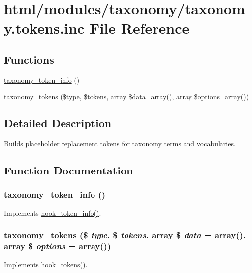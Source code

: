\hypertarget{taxonomy_8tokens_8inc}{
\section{html/modules/taxonomy/taxonomy.tokens.inc File Reference}
\label{taxonomy_8tokens_8inc}
}
\subsection*{Functions}
\begin{DoxyCompactItemize}
\item 
\hyperlink{taxonomy_8tokens_8inc_ad5e9671b12bbb1663aaf884486e4e63a}{taxonomy\_\-token\_\-info} ()
\item 
\hyperlink{taxonomy_8tokens_8inc_adcc9a4b5359d355e80f56436164af8ef}{taxonomy\_\-tokens} (\$type, \$tokens, array \$data=array(), array \$options=array())
\end{DoxyCompactItemize}


\subsection{Detailed Description}
Builds placeholder replacement tokens for taxonomy terms and vocabularies. 

\subsection{Function Documentation}
\hypertarget{taxonomy_8tokens_8inc_ad5e9671b12bbb1663aaf884486e4e63a}{
\subsubsection[{taxonomy\_\-token\_\-info}]{\setlength{\rightskip}{0pt plus 5cm}taxonomy\_\-token\_\-info ()}}
\label{taxonomy_8tokens_8inc_ad5e9671b12bbb1663aaf884486e4e63a}
Implements \hyperlink{group__hooks_gab868597197cf36911f95dcd29ae0b954}{hook\_\-token\_\-info()}. \hypertarget{taxonomy_8tokens_8inc_adcc9a4b5359d355e80f56436164af8ef}{
\subsubsection[{taxonomy\_\-tokens}]{\setlength{\rightskip}{0pt plus 5cm}taxonomy\_\-tokens (\$ {\em type}, \/  \$ {\em tokens}, \/  array \$ {\em data} = {\ttfamily array()}, \/  array \$ {\em options} = {\ttfamily array()})}}
\label{taxonomy_8tokens_8inc_adcc9a4b5359d355e80f56436164af8ef}
Implements \hyperlink{group__hooks_ga3bfd87d9a19b2397b0f970e1cff7ea4f}{hook\_\-tokens()}. 